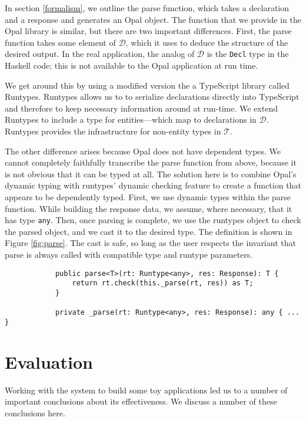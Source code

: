 \documentclass[twocolumn]{article}
\newcommand{\ts}[1]{\texttt{#1}}
\newcommand{\hs}[1]{\texttt{#1}}
\newcommand{\fcy}[1]{\mathcal{#1}}
\begin{document}
In section \ref{formalism}, we outline the parse function, which takes a
declaration and a response and generates an Opal object. The function that we
provide in the Opal library is similar, but there are two important differences.
First, the parse function takes some element of $\fcy{D}$, which it uses to
deduce the structure of the desired output. In the real application, the analog
of $\fcy{D}$ is the \hs{Decl} type in the Haskell code; this is not available to
the Opal application at run time.

We get around this by using a modified version the a TypeScript library called
Runtypes.\cite{runtypes} Runtypes allows us to to serialize declarations
directly into TypeScript and therefore to keep necessary information around at
run-time. We extend Runtypes to include a type for entities---which map to
declarations in $\fcy{D}$. Runtypes provides the infrastructure for non-entity
types in $\fcy{T}$.

The other difference arises because Opal does not have dependent types. We
cannot completely faithfully transcribe the parse function from above, because
it is not obvious that it can be typed at all. The solution here is to combine
Opal's dynamic typing with runtypes' dynamic checking feature to create a
function that appears to be dependently typed. First, we use dynamic types
within the parse function. While building the response data, we assume, where
necessary, that it has type \ts{any}. Then, once parsing is complete, we use the
runtypes object to check the parsed object, and we cast it to the desired type.
The definition is shown in Figure \ref{fig:parse}. The cast is safe, so long as
the user respects the invariant that parse is always called with compatible type
and runtype parameters.

\begin{figure*}
\begin{verbatim}
            public parse<T>(rt: Runtype<any>, res: Response): T {
                return rt.check(this._parse(rt, res)) as T;
            }

            private _parse(rt: Runtype<any>, res: Response): any { ... }
\end{verbatim}
  \caption{The wit parse functions.}
  \label{fig:parse}
\end{figure*}

\section{Evaluation} \label{evaluation}
Working with the system to build some toy applications led us to a number of
important conclusions about its effectiveness. We discuss a number of these
conclusions here.
\end{document}
